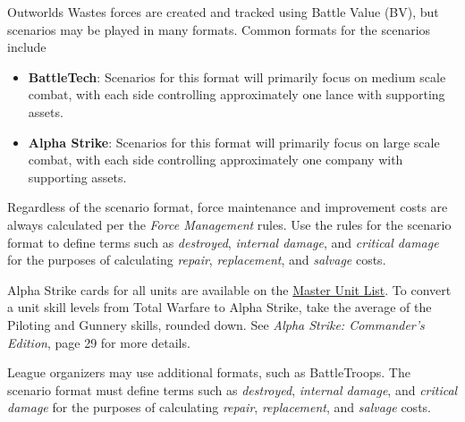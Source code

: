 Outworlds Wastes forces are created and tracked using Battle Value (BV), but scenarios may be played in many formats.
Common formats for the scenarios include

\begin{itemize}

\item {\bfseries BattleTech}: Scenarios for this format will primarily focus on medium scale combat, with each side controlling approximately one lance with supporting assets.

\item {\bfseries Alpha Strike}: Scenarios for this format will primarily focus on large scale combat, with each side controlling approximately one company with supporting assets.

\end{itemize}

Regardless of the scenario format, force maintenance and improvement costs are always calculated per the \emph{Force Management} rules.
Use the rules for the scenario format to define terms such as \emph{destroyed}, \emph{internal damage}, and \emph{critical damage} for the purposes of calculating \emph{repair}, \emph{replacement}, and \emph{salvage} costs.

Alpha Strike cards for all units are available on the \href{http://www.masterunitlist.info}{Master Unit List}.
To convert a unit skill levels from Total Warfare to Alpha Strike, take the average of the Piloting and Gunnery skills, rounded down.
See \emph{Alpha Strike: Commander's Edition}, page 29 for more details.

League organizers may use additional formats, such as BattleTroops.
The scenario format must define terms such as \emph{destroyed}, \emph{internal damage}, and \emph{critical damage} for the purposes of calculating \emph{repair}, \emph{replacement}, and \emph{salvage} costs.
